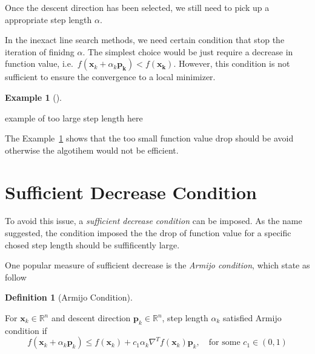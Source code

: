\documentclass[
  letterpaper,
  DIV=11,
  numbers=noendperiod]{scrreprt}
\theoremstyle{definition}
\newtheorem{definition}{Definition}[chapter]
\theoremstyle{plain}
\theoremstyle{plain}
\theoremstyle{definition}
\newtheorem{example}{Example}[chapter]
\theoremstyle{plain}
\theoremstyle{plain}
\theoremstyle{remark}
\begin{document}
Once the descent direction has been selected, we still need to pick up a
appropriate step length \(\alpha\).

In the inexact line search methods, we need certain condition that stop
the iteration of finidng \(\alpha\). The simplest choice would be just
require a decrease in function value,
i.e.~\(f(\mathbf{x}_k + \alpha_k\mathbf{p_k})< f(\mathbf{x_k})\).
However, this condition is not sufficient to ensure the convergence to a
local minimizer.

\begin{example}[]\protect\hypertarget{exm-tooSmall}{}\label{exm-tooSmall}

example of too large step length here

\end{example}

The Example~\ref{exm-tooSmall} shows that the too small function value
drop should be avoid otherwise the algotihem would not be efficient.

\section{Sufficient Decrease
Condition}\label{sufficient-decrease-condition}

To avoid this issue, a \emph{sufficient decrease condition} can be
imposed. As the name suggested, the condition imposed the the drop of
function value for a specific chosed step length should be suffificently
large.

One popular measure of sufficient decrease is the \emph{Armijo
condition}, which state as follow

\begin{definition}[Armijo
Condition]\protect\hypertarget{def-armijo}{}\label{def-armijo}

For \(\mathbf{x}_k\in\mathbb{R}^n\) and descent direction
\(\mathbf{p}_k\in\mathbb{R}^n\), step length \(\alpha_k\) satisfied
Armijo condition if \[
f(\mathbf{x}_k+\alpha_k\mathbf{p}_k)\leq f(\mathbf{x}_k) + c_1\alpha_k\nabla^Tf(\mathbf{x}_k)\mathbf{p}_k,\quad \text{for some } c_1\in (0, 1)
\]

\end{definition}
\end{document}
